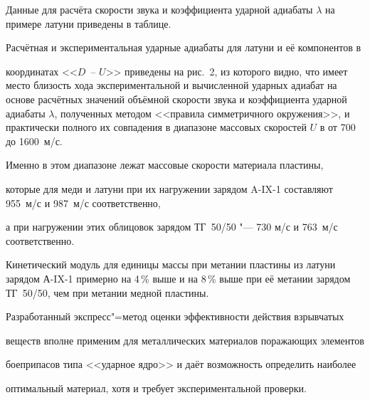 Данные для расчёта скорости звука и коэффициента ударной адиабаты $\lambda $ на примере латуни приведены в таблице.





Расчётная и экспериментальная ударные адиабаты для латуни и её компонентов в

координатах <<$D$~-- $U$>>  приведены на рис.~2, из которого видно, что имеет место близость хода экспериментальной и вычисленной ударных адиабат на основе расчётных значений объёмной скорости звука и коэффициента ударной адиабаты  $\lambda $, полученных методом <<правила симметричного окружения>>, и практически полного их совпадения в диапазоне массовых скоростей $U$ в от 700 до 1600~м/с.

Именно в этом диапазоне лежат массовые скорости материала пластины, 

которые для меди и латуни при их нагружении зарядом A-IX-1 составляют 955~м/с и 987~м/с соответственно, 

а при нагружении этих облицовок зарядом ТГ~50/50 "--- 730 м/с и 763~м/с соответственно. 

Кинетический модуль для единицы массы при метании пластины из латуни зарядом А-IX-1  примерно на 4\,\% выше и на 8\,\% выше при её метании зарядом ТГ~50/50, чем при метании медной пластины.



\smallskip


Разработанный экспресс"=метод оценки эффективности действия \linebreak взрывчатых

веществ вполне применим для металлических материалов поражающих элементов

боеприпасов типа <<ударное ядро>> и даёт возможность определить наиболее

оптимальный материал, хотя и требует экспериментальной проверки.



